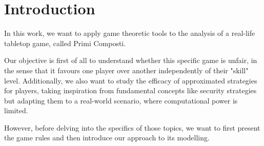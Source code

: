\section{Introduction} \label{section:Introduction}%

In this work, we want to apply game theoretic tools to the analysis of a real-life tabletop game, called Primi Composti.

Our objective is first of all to understand whether this specific game is unfair, in the sense that it favours one player over another independently of their "skill" level. Additionally, we also want to study the efficacy of approximated strategies for players, taking inspiration from fundamental concepts like security strategies but adapting them to a real-world scenario, where computational power is limited.

However, before delving into the specifics of those topics, we want to first present the game rules and then introduce our approach to its modelling.


